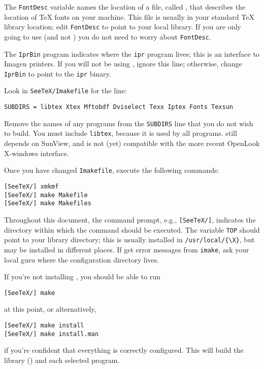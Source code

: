 The \verb|FontDesc| variable names the location of a file, called
{\fontdesc}, that describes the location of {\TeX} fonts
on your machine. This file is usually in your
standard {\TeX} library location; edit \verb|FontDesc| to point to your
local library. If you are only going to use {\xtex} (and not {\mftobdf})
you do not need to worry about \verb|FontDesc|.

The \verb|IprBin| program indicates where the \verb|ipr| program lives;
this is an interface to Imagen printers. If you will not be using {\iptex},
ignore this line; otherwise, change \verb|IprBin| to point to the \verb|ipr|
binary.

Look in \verb|SeeTeX/Imakefile| for the line: 
\begin{verbatim}
SUBDIRS = libtex Xtex Mftobdf Dviselect Texx Iptex Fonts Texsun  
\end{verbatim}
Remove the names of any programs from the \verb|SUBDIRS| line that you
do not wish to build. You must include \verb|libtex|, because it is
used by all programs. {\texsun} still depends on SunView, and is not
(yet) compatible with the more recent OpenLook X-windows interface.

Once you have changed \verb|Imakefile|, execute the following commands:

\begin{verbatim}
[SeeTeX/] xmkmf
[SeeTeX/] make Makefile
[SeeTeX/] make Makefiles
\end{verbatim}

Throughout this document,
the command prompt, e.g., \verb|[SeeTeX/]|,
indicates the directory within which the
command should be executed.  The variable \verb|TOP| should point to
your {\X} library directory; this is usually installed in
\verb|/usr/local/{\X}|, but may be installed in different places. If
get error messages from \verb|imake|, ask your local {\X} guru where the
configuration directory lives.

If you're not installing {\xtex}, you should be able to run
\begin{verbatim}
[SeeTeX/] make
\end{verbatim}
at this point, or alternatively,
\begin{verbatim}
[SeeTeX/] make install
[SeeTeX/] make install.man
\end{verbatim}
if you're confident that everything is correctly configured.
This will build the library ({\libtex}) and each selected program.


